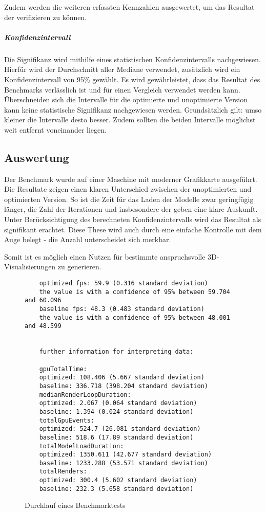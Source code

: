 Zudem werden die weiteren erfassten Kennzahlen ausgewertet, um das Resultat der  verifizieren zu können.

\subparagraph{Konfidenzintervall}
Die Signifikanz wird mithilfe eines statistischen Konfidenzintervalls nachgewiesen. Hierfür wird der Durchschnitt aller Mediane verwendet, zusätzlich wird ein Konfidenzintervall von 95\% gewählt. Es wird gewährleistet, dass das Resultat des Benchmarks verlässlich ist und für einen Vergleich verwendet werden kann. Überschneiden sich die Intervalle für die optimierte und unoptimierte Version kann keine statistische Signifikanz nachgewiesen werden. Grundsätzlich gilt: umso kleiner die Intervalle desto besser. Zudem sollten die beiden Intervalle möglichst weit entfernt voneinander liegen.

\subsection{Auswertung}
\label{chap:benchmarkResults}

Der Benchmark wurde auf einer Maschine mit moderner Grafikkarte ausgeführt. Die Resultate zeigen einen klaren Unterschied zwischen der unoptimierten und optimierten Version. So ist die Zeit für das Laden der Modelle zwar geringfügig länger, die Zahl der  Iterationen und insbesondere der  geben eine klare Auskunft. Unter Berücksichtigung des berechneten Konfidenzintervalls wird das Resultat als signifikant erachtet. Diese These wird auch durch eine einfache Kontrolle mit dem Auge belegt - die Anzahl  unterscheidet sich merkbar.

Somit ist es möglich einen Nutzen für bestimmte anspruchsvolle 3D-Visualisierungen zu generieren.

\begin{figure}[H]
  \begin{lstlisting}
    optimized fps: 59.9 (0.316 standard deviation)
    the value is with a confidence of 95% between 59.704 and 60.096
    baseline fps: 48.3 (0.483 standard deviation)
    the value is with a confidence of 95% between 48.001 and 48.599


    further information for interpreting data:

    gpuTotalTime:
    optimized: 108.406 (5.667 standard deviation)
    baseline: 336.718 (398.204 standard deviation)
    medianRenderLoopDuration:
    optimized: 2.067 (0.064 standard deviation)
    baseline: 1.394 (0.024 standard deviation)
    totalGpuEvents:
    optimized: 524.7 (26.081 standard deviation)
    baseline: 518.6 (17.89 standard deviation)
    totalModelLoadDuration:
    optimized: 1350.611 (42.677 standard deviation)
    baseline: 1233.288 (53.571 standard deviation)
    totalRenders:
    optimized: 300.4 (5.602 standard deviation)
    baseline: 232.3 (5.658 standard deviation)
  \end{lstlisting}
\caption{Durchlauf eines Benchmarktests}
\label{fig:benchmarkRun}
\end{figure}

